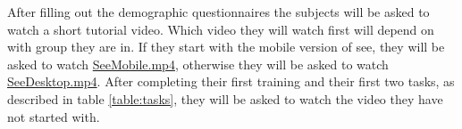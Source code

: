 After filling out the demographic questionnaires the subjects will be asked to watch a short tutorial video.
Which video they will watch first will depend on with group they are in.
If they start with the mobile version of \gls{see}, they will be asked to watch \hyperref[calc]{SeeMobile.mp4}, otherwise they will be asked to watch \hyperref[calc]{SeeDesktop.mp4}.
After completing their first training and their first two tasks, as described in table \ref{table:tasks}, they will be asked to watch the video they have not started with.

\begin{table}[htb]
\end{table}
